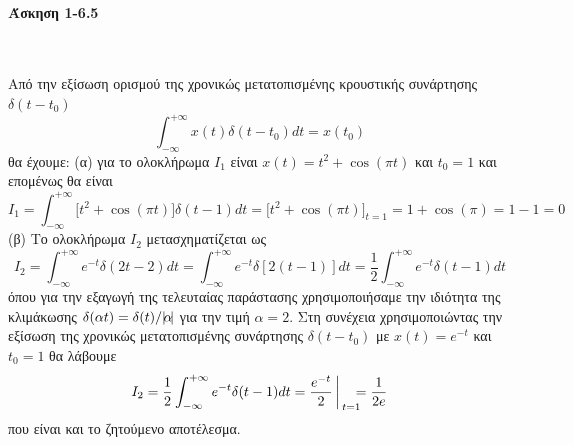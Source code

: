 \documentclass[a4paper,twoside,10pt,openany]{memoir}
\theoremstyle{dotless}
\newcounter{problem}[section] %
\begin{document}
\pagestyle{empty}


\paragraph {Άσκηση 1-6.5}~\medskip


\begin{solution}
Από την εξίσωση ορισμού της χρονικώς μετατοπισμένης κρουστικής συνάρτησης $\delta(t-t_0)$
\begin{equation*}
\int_{-\infty}^{+\infty}x(t)\delta(t-t_0)dt=x(t_0)
\end{equation*}
θα έχουμε: (α) για το ολοκλήρωμα $I_1$ είναι $x(t)=t^2+\cos(\pi t)$ και $t_0=1$ και επομένως θα είναι
\begin{equation*}
I_1\!=\!\int_{-\infty}^{+\infty}\bigg[t^2\!+\!\cos(\pi t)\bigg]\delta(t-1)dt\!=\!
\bigg[t^2\!+\!\cos(\pi t)\bigg]_{t=1}\!\!\!=1\!+\!\cos(\pi)\!=\!1\!-\!1\!=\!0
\end{equation*}
(β) Το ολοκλήρωμα $I_2$ μετασχηματίζεται ως
\begin{equation*}
I_2=\int_{-\infty}^{+\infty}e^{-t}\delta(2t-2)dt=\int_{-\infty}^{+\infty}e^{-t}\delta[2(t-1)]dt=\frac{1}{2}
\int_{-\infty}^{+\infty}e^{-t}\delta(t-1)dt
\end{equation*}
όπου για την εξαγωγή της τελευταίας παράστασης χρησιμοποιήσαμε την ιδιότητα της κλιμάκωσης $\delta(\alpha t)=\delta(t)/\arrowvert \!\alpha\!\arrowvert$ για την τιμή $\alpha=2$. Στη συνέχεια χρησιμοποιώντας την εξίσωση της χρονικώς μετατοπισμένης συνάρτησης $\delta(t-t_0)$ με $x(t)=e^{-t}$ και $t_0=1$ θα λάβουμε
\begin{equation*}
I_2=\frac{1}{2}\int_{-\infty}^{+\infty}e^{-t}\delta(t-1)dt=\frac{e^{-t}}{2}\bigg\arrowvert_{t=1}\!\!\!\!=\frac{1}{2e}
\end{equation*}
που είναι και το ζητούμενο αποτέλεσμα.
\end{solution}
\end{document}
